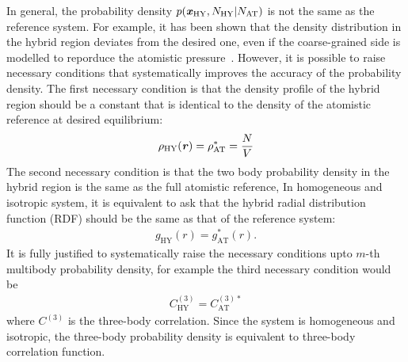 \documentclass[epjST]{svjour}
\newcommand{\vect}[1]{\textbf{\textit{#1}}}
\newcommand{\AT}[0]{\textrm{AT}}
\newcommand{\HY}[0]{\textrm{HY}}
\begin{document}
In general, the probability density $p(\vect x_\HY, N_\HY\vert N_\AT)$
is not the same as the reference system.  For example, it has been
shown that the density distribution in the hybrid region deviates from
the desired one, even if the coarse-grained side is modelled to
reporduce the atomistic pressure~\cite{poblete2010coupling}.  However,
it is possible to raise necessary conditions that systematically
improves the accuracy of the probability density. The first necessary
condition is that the density profile of the hybrid region should be a
constant that is identical to the density of the atomistic reference
at desired equilibrium:
\begin{align}\label{eqn:necessary-1st}
  \rho_\HY(\vect r) = \rho_\AT^\ast = \frac NV
\end{align}
The second necessary condition is that the two body probability
density in the hybrid region is the same as the full atomistic
reference, In homogeneous and isotropic system, it is equivalent to
ask that the hybrid radial distribution function (RDF) should be the
same as that of the reference system:
\begin{align}\label{eqn:necessary-2nd}
  g_\HY(r) = g^\ast_\AT(r).
\end{align}
It is fully justified to systematically raise the necessary conditions
upto $m$-th multibody probability density, for example the third necessary condition would be
\begin{align}
  C^{(3)}_\HY = C^{(3)\ast}_\AT
\end{align}
where $C^{(3)}$ is the three-body correlation.
Since the system is homogeneous
and isotropic, the three-body probability density is equivalent to
three-body correlation function. 
\end{document}
